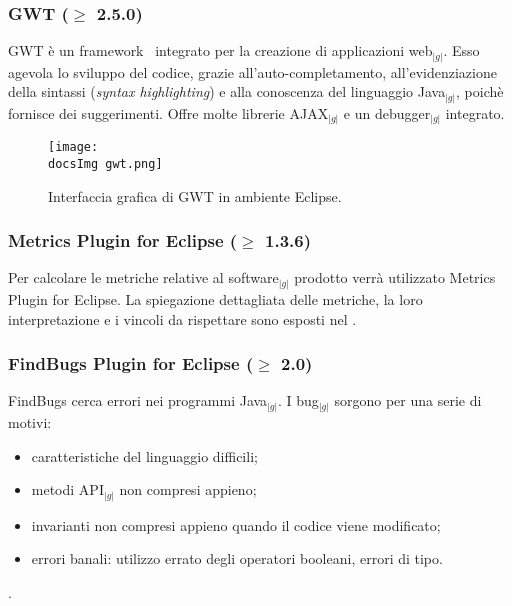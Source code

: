 {{{		}
		\subsubsection{GWT ($\geqslant$ 2.5.0)}{
			GWT è un framework\g~ integrato per la creazione di applicazioni web$_{|g|}$. 
			Esso agevola lo sviluppo del codice, grazie all'auto-completamento, all'evidenziazione
			della sintassi (\textit{syntax highlighting}) e alla conoscenza del linguaggio Java$_{|g|}$, 
			poichè fornisce dei suggerimenti. Offre molte librerie AJAX$_{|g|}$ e un debugger$_{|g|}$ integrato.
			\begin{center}
				\begin{figure}[h]
					\centering
					\texttt{[image: \\docsImg gwt.png]}
					\caption{Interfaccia grafica di GWT in ambiente Eclipse.}	
				\end{figure}
			\end{center}
		}
		\subsubsection{Metrics Plugin for Eclipse ($\geqslant$ 1.3.6)}\label{plugMETRICS}{
			Per calcolare le metriche relative al software$_{|g|}$ prodotto verrà utilizzato Metrics Plugin for Eclipse. La spiegazione dettagliata
			delle metriche, la loro interpretazione e i vincoli da rispettare sono esposti nel \emph{\PianoDiQualifica}.
		}
		\subsubsection{FindBugs Plugin for Eclipse ($\geqslant$ 2.0)}\label{findbugs}{
			FindBugs cerca errori nei programmi Java$_{|g|}$. I bug$_{|g|}$ sorgono per una serie di motivi:
			\begin{itemize}
				\item caratteristiche del linguaggio difficili;
				\item metodi API$_{|g|}$ non compresi appieno;
				\item invarianti non compresi appieno quando il codice viene modificato;
				\item errori banali: utilizzo errato degli operatori booleani, errori di tipo.
			\end{itemize}.
			
}}}
